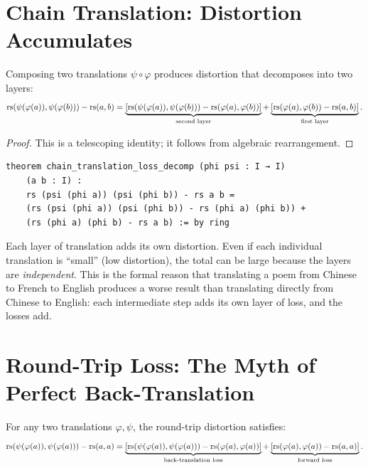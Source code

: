 \section{Chain Translation: Distortion Accumulates}

\begin{theorem}
\label{thm:chain-decomp}
Composing two translations $\psi \circ \varphi$ produces distortion
that decomposes into two layers:
\[
  \mathrm{rs}(\psi(\varphi(a)), \psi(\varphi(b))) - \mathrm{rs}(a, b)
  = \underbrace{[\mathrm{rs}(\psi(\varphi(a)), \psi(\varphi(b)))
    - \mathrm{rs}(\varphi(a), \varphi(b))]}_{\text{second layer}} +
    \underbrace{[\mathrm{rs}(\varphi(a), \varphi(b)) - \mathrm{rs}(a, b)]}_{\text{first layer}}.
\]
\end{theorem}

\begin{proof}
This is a telescoping identity; it follows from algebraic rearrangement.
\end{proof}

\begin{lstlisting}
theorem chain_translation_loss_decomp (phi psi : I → I)
    (a b : I) :
    rs (psi (phi a)) (psi (phi b)) - rs a b =
    (rs (psi (phi a)) (psi (phi b)) - rs (phi a) (phi b)) +
    (rs (phi a) (phi b) - rs a b) := by ring
\end{lstlisting}

\begin{interpretation}
Each layer of translation adds its own distortion.  Even if each individual
translation is ``small'' (low distortion), the total can be large because
the layers are \emph{independent}.  This is the formal reason that
translating a poem from Chinese to French to English produces a worse
result than translating directly from Chinese to English: each intermediate
step adds its own layer of loss, and the losses add.
\end{interpretation}

\section{Round-Trip Loss: The Myth of Perfect Back-Translation}

\begin{theorem}
\label{thm:round-trip}
For any two translations $\varphi, \psi$, the round-trip distortion
satisfies:
\[
  \mathrm{rs}(\psi(\varphi(a)), \psi(\varphi(a))) - \mathrm{rs}(a, a)
  = \underbrace{[\mathrm{rs}(\psi(\varphi(a)), \psi(\varphi(a)))
    - \mathrm{rs}(\varphi(a), \varphi(a))]}_{\text{back-translation loss}} +
    \underbrace{[\mathrm{rs}(\varphi(a), \varphi(a)) - \mathrm{rs}(a, a)]}_{\text{forward loss}}.
\]
\end{theorem}

